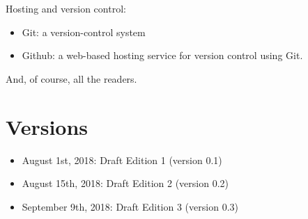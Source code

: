 \documentclass[12pt]{book}
\begin{document}
Hosting and version control:
\begin{itemize}
	\item Git: a version-control system
	\item Github: a web-based hosting service for version control using Git.
\end{itemize}

And, of course, all the readers.

\newpage
\chapter*{Versions}

\noindent
\begin{itemize}
	\item August 1st, 2018: \hspace{2cm} Draft Edition 1 (version 0.1)
	\item August 15th, 2018: \hspace{2cm} Draft Edition 2 (version 0.2)
	\item September 9th, 2018: \hspace{2cm} Draft Edition 3 (version 0.3)
\end{itemize}



\ifx\wholebook\relax\else
% 
% 
	
\end{document}
